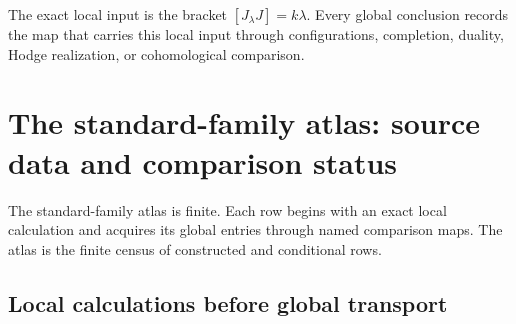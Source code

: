 \documentclass[11pt]{article}
\theoremstyle{plain}
\theoremstyle{definition}
\theoremstyle{remark}
\begin{document}
The exact local input is the bracket \([J_\lambda J]=k\lambda\).
Every global conclusion records the map that carries this local input
through configurations, completion, duality, Hodge realization, or
cohomological comparison.


\section{The standard-family atlas: source data and comparison status}
\label{sec:landscape}

The standard-family atlas is finite.  Each row begins with an
exact local calculation and acquires its global entries through named
comparison maps.  The atlas is the finite census of constructed and
conditional rows.

\subsection{Local calculations before global transport}
\end{document}
